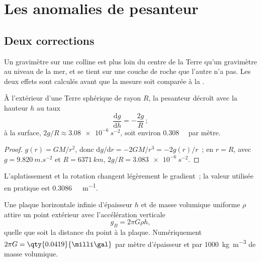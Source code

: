 \section{Les anomalies de pesanteur}

\subsection*{Deux corrections}

Un gravimètre sur une colline est plus loin du centre de la Terre qu'un gravimètre
au niveau de la mer, et se tient sur une couche de roche que l'autre n'a pas. Les
deux effets sont calculés avant que la mesure soit comparée à la .

\begin{proposition}\label{prop:b1:isostasy-gravity:free-air}
À l'extérieur d'une Terre sphérique de rayon $R$, la pesanteur décroît avec la
hauteur $h$ au taux
\[
  \frac{\mathrm dg}{\mathrm dh} = -\frac{2g}{R}\,;
\]
à la surface, $2g/R \approx \qty{3.08e-6}{s^{-2}}$, soit environ
\qty{0.308}{\milli\gal} par mètre.
\end{proposition}

\begin{proof}
$g(r) = GM/r^2$, donc $\mathrm dg/\mathrm dr = -2GM/r^3 = -2g(r)/r$~; en $r = R$,
avec $g = \qty{9.820}{m.s^{-2}}$ et $R = \qty{6371}{km}$, $2g/R =
\qty{3.083e-6}{s^{-2}}$.
\end{proof}

L'aplatissement et la rotation changent légèrement le gradient~; la valeur utilisée
en pratique est \qty{0.3086}{\milli\gal.m^{-1}}.

\begin{proposition}\label{prop:b1:isostasy-gravity:slab}
Une plaque horizontale infinie d'épaisseur $h$ et de masse volumique uniforme $\rho$
attire un point extérieur avec l'accélération verticale
\[
  g_B = 2\pi G\rho h ,
\]
quelle que soit la distance du point à la plaque. Numériquement $2\pi G =
\qty{0.0419}{\milli\gal}$ par mètre d'épaisseur et par \qty{1000}{kg.m^{-3}} de
masse volumique.
\end{proposition}

